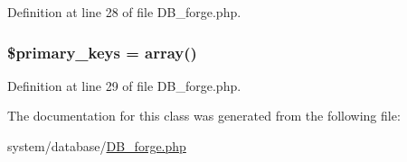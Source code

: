 Definition at line 28 of file D\-B\-\_\-forge.\-php.

\hypertarget{class_c_i___d_b__forge_a09349689030ba7198a094abf357c78bc}{
\subsubsection[{\$primary\-\_\-keys}]{\setlength{\rightskip}{0pt plus 5cm}\$primary\-\_\-keys = array()}}\label{class_c_i___d_b__forge_a09349689030ba7198a094abf357c78bc}


Definition at line 29 of file D\-B\-\_\-forge.\-php.



The documentation for this class was generated from the following file\-:\begin{DoxyCompactItemize}
\item 
system/database/\hyperlink{_d_b__forge_8php}{D\-B\-\_\-forge.\-php}\end{DoxyCompactItemize}
